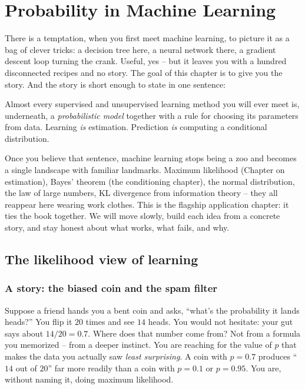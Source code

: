\chapter{Probability in Machine Learning}

There is a temptation, when you first meet machine learning, to picture it as a
bag of clever tricks: a decision tree here, a neural network there, a gradient
descent loop turning the crank. Useful, yes -- but it leaves you with a hundred
disconnected recipes and no story. The goal of this chapter is to give you the
story. And the story is short enough to state in one sentence:

\begin{focusbox}
Almost every supervised and unsupervised learning method you will ever meet is,
underneath, a \emph{probabilistic model} together with a rule for choosing its
parameters from data. Learning \emph{is} estimation. Prediction \emph{is}
computing a conditional distribution.
\end{focusbox}

Once you believe that sentence, machine learning stops being a zoo and becomes a
single landscape with familiar landmarks. Maximum likelihood (Chapter on
estimation), Bayes' theorem (the conditioning chapter), the normal distribution,
the law of large numbers, KL divergence from information theory -- they all
reappear here wearing work clothes. This is the flagship application chapter: it
ties the book together. We will move slowly, build each idea from a concrete
story, and stay honest about what works, what fails, and why.

\section{The likelihood view of learning}
\label{ch34:likelihood-view}

\subsection{A story: the biased coin and the spam filter}

Suppose a friend hands you a bent coin and asks, ``what's the probability it
lands heads?'' You flip it $20$ times and see $14$ heads. You would not hesitate:
your gut says about $14/20 = 0.7$. Where does that number come from? Not from a
formula you memorized -- from a deeper instinct. You are reaching for the value of
$p$ that makes the data you actually saw \emph{least surprising}. A coin with
$p=0.7$ produces ``$14$ out of $20$'' far more readily than a coin with $p=0.1$
or $p=0.95$. You are, without naming it, doing maximum likelihood.

